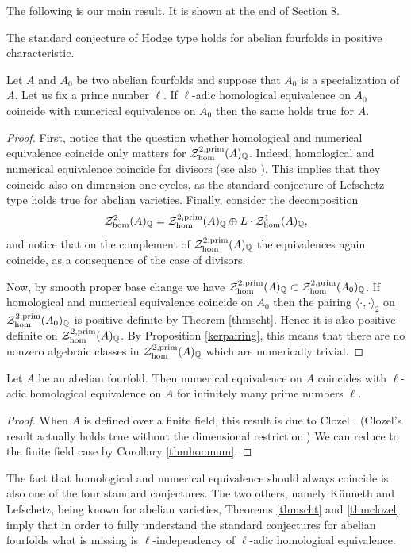 \documentclass[11pt]{amsart}
\begin{document}
The following is our main result. It is shown at the end of Section 8.
\begin{theorem}\label{thmscht}
The standard conjecture of Hodge type holds for abelian fourfolds in positive characteristic.
\end{theorem}

\begin{corollary}\label{thmhomnum}
Let $A$ and $A_0$ be two   abelian fourfolds and suppose that  $A_0$ is a specialization of $A$. Let us fix a prime number $\ell$. If  $\ell$-adic homological equivalence on $A_0$ coincide with numerical equivalence on $A_0$ then the same holds true for $A$.
\end{corollary}
\begin{proof} First, notice that the question whether homological and numerical equivalence coincide only matters for $\mathcal{Z}_{\hom}^{2,\mathrm{prim}}(A)_{\mathbb{Q}}$. Indeed, homological and numerical equivalence coincide for divisors \cite{matsu} (see also \cite[Proposition 3.4.6.1]{Andmot}). This implies   that they coincide also on dimension one cycles,   as the standard conjecture of Lefschetz type holds true for abelian varieties. Finally, consider the decomposition \[\mathcal{Z}_{\hom}^{2 }(A)_{\mathbb{Q}} =\mathcal{Z}_{\hom}^{2,\mathrm{prim}}(A)_{\mathbb{Q}} \oplus L \cdot \mathcal{Z}_{\hom}^{1}(A)_{\mathbb{Q}},\]
and notice that on the complement of $\mathcal{Z}_{\hom}^{2,\mathrm{prim}}(A)_{\mathbb{Q}} $ the equivalences again coincide, as a consequence of the case of divisors.

Now, by smooth proper base change we have $\mathcal{Z}_{\hom}^{2,\mathrm{prim}}(A)_{\mathbb{Q}}\subset \mathcal{Z}_{\hom}^{2,\mathrm{prim}}(A_0)_{\mathbb{Q}}$. If    homological and numerical equivalence  coincide on $A_0$ then the pairing $\langle \cdot, \cdot \rangle_{2}$ on  $\mathcal{Z}_{\hom}^{2,\mathrm{prim}}(A_0)_{\mathbb{Q}}$ is positive definite by Theorem \ref{thmscht}. Hence it is also positive definite on $\mathcal{Z}_{\hom}^{2,\mathrm{prim}}(A)_{\mathbb{Q}}$.   By  Proposition \ref{kerpairing}, this means that there are no nonzero algebraic classes in $\mathcal{Z}_{\hom}^{2,\mathrm{prim}}(A)_{\mathbb{Q}}$ which are numerically trivial.
\end{proof}
\begin{theorem}\label{thmclozel}
Let $A$ be an   abelian fourfold. Then numerical equivalence on $A$ coincides with $\ell$-adic homological equivalence on $A$ for infinitely many prime numbers $\ell$. 
\end{theorem}
\begin{proof}
When $A$ is defined over a finite field, this result is due to Clozel \cite{Clozel}. (Clozel's result actually holds true without the dimensional restriction.) We can reduce to the finite field case by Corollary \ref{thmhomnum}.
\end{proof}
\begin{remark}
The fact that homological and numerical equivalence should always coincide is also one of the four standard conjectures. The two others, namely K\"unneth and Lefschetz, being known for abelian varieties, Theorems \ref{thmscht} and \ref{thmclozel} imply that in order to fully understand the standard conjectures for abelian fourfolds what is missing is $\ell$-independency of $\ell$-adic homological equivalence.
\end{remark}
\end{document}
